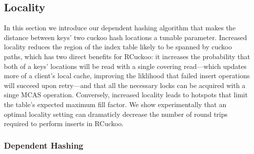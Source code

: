 


\subsection{Locality}



In this section we introduce our dependent hashing algorithm that
makes the distance between keys' two cuckoo hash locations a tunable
parameter.  Increased locality reduces the region of the index table likely
to be spanned by cuckoo paths, which has two direct benefits for
RCuckoo: it increases the probability that both of a keys' locations
will be read with a single covering read---which updates more of a
client's local cache, improving the liklihood that failed insert
operations will succeed upon retry---and that all the necessary locks
can be acquired with a singe MCAS operation.  Conversely, increased
locality leads to hotspots that limit the table's expected maximum
fill factor.  We show experimentally that an optimal locality setting
can dramaticly decrease the number of round trips required to
perform inserts in RCuckoo.


\subsubsection{Dependent Hashing}


